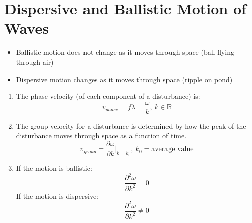 \documentclass[a4paper, 11pt, normalem]{report}
\newcommand\p{\partial}
\newcommand\lam{\lambda}
\begin{document}
\section{Dispersive and Ballistic Motion of Waves}
\begin{itemize}
    \item Ballistic motion does not change as it moves through space (ball flying through air)
    \item Dispersive motion changes as it moves through space (ripple on pond)
\end{itemize}
\begin{enumerate}
    \item The phase velocity (of each component of a disturbance) is:
    \begin{equation*}
        v_{phase} = f\lam = \frac{\omega}{k},~ k \in \mathbb{R}
    \end{equation*}
    \item The group velocity for a disturbance is determined by how the peak of the disturbance moves through space as a function of time.
    \begin{equation*}
        v_{group} = \frac{\p\omega}{\p k}\Bigg|_{k = k_0}, ~ k_0 = \text{average value}
    \end{equation*}
    \item If the motion is ballistic:
    \begin{equation*}
        \frac{\p^2\omega}{\p k^2} = 0
    \end{equation*}
    If the motion is dispersive:
    \begin{equation*}
        \frac{\p^2 \omega}{\p k^2} \neq 0
    \end{equation*}
\end{enumerate}
\end{document}
